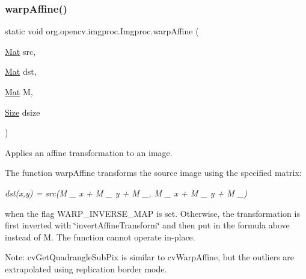 \subsubsection{\texorpdfstring{warp\+Affine()}{warpAffine()}\hspace{0.1cm}{\footnotesize\ttfamily [3/3]}}
{\footnotesize\ttfamily static void org.\+opencv.\+imgproc.\+Imgproc.\+warp\+Affine (\begin{DoxyParamCaption}\item[{\mbox{\hyperlink{classorg_1_1opencv_1_1core_1_1_mat}{Mat}}}]{src,  }\item[{\mbox{\hyperlink{classorg_1_1opencv_1_1core_1_1_mat}{Mat}}}]{dst,  }\item[{\mbox{\hyperlink{classorg_1_1opencv_1_1core_1_1_mat}{Mat}}}]{M,  }\item[{\mbox{\hyperlink{classorg_1_1opencv_1_1core_1_1_size}{Size}}}]{dsize }\end{DoxyParamCaption})\hspace{0.3cm}{\ttfamily [static]}}

Applies an affine transformation to an image.

The function {\ttfamily warp\+Affine} transforms the source image using the specified matrix\+:

{\itshape dst(x,y) = src(M \+\_ x + M \+\_ y + M \+\_, M \+\_ x + M \+\_ y + M \+\_)}

when the flag {\ttfamily W\+A\+R\+P\+\_\+\+I\+N\+V\+E\+R\+S\+E\+\_\+\+M\+AP} is set. Otherwise, the transformation is first inverted with \char`\"{}invert\+Affine\+Transform\char`\"{} and then put in the formula above instead of {\ttfamily M}. The function cannot operate in-\/place.

Note\+: {\ttfamily cv\+Get\+Quadrangle\+Sub\+Pix} is similar to {\ttfamily cv\+Warp\+Affine}, but the outliers are extrapolated using replication border mode.



